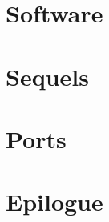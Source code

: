 \documentclass[8pt]{book}
\begin{document}
  
      
    \chapter{Software}
       
       
      
       
       
      
       
    
  
           


\chapter{Sequels}
        
        

    \chapter{Ports}        
        
        
    
       \chapter{Epilogue}
        

        \appendix
    \appendixpage

%         
    
%           
%         
%          
%           
%         
%         

    
%     
\end{document}
